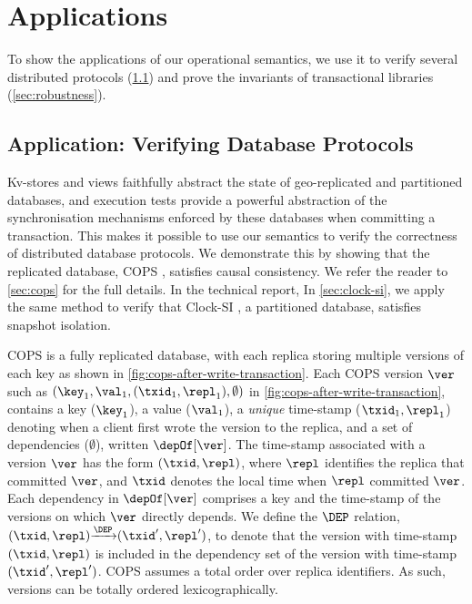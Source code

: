 \section{Applications}
\label{sec:applications}

To show the applications of our operational semantics, 
we use it to verify several distributed protocols (\cref{sec:verify-impl}) and
prove the invariants of transactional libraries (\cref{sec:robustness}).

\subsection{Application: Verifying Database Protocols}
\label{sec:verify-impl}
Kv-stores and views faithfully abstract the state of geo-replicated and partitioned
databases, and execution tests provide a powerful abstraction of the synchronisation mechanisms 
enforced by these databases when committing a transaction. 
This makes it possible to use our 
semantics to verify the correctness of distributed database protocols. 
We demonstrate this by showing that the replicated database,
COPS \cite{cops}, satisfies causal consistency.
We refer the reader to \cref{sec:cops} for the full details.
\ifTechRepEdits%
In the technical report,
\else%
In \cref{sec:clock-si}, 
\fi
we apply the same method to verify that 
Clock-SI \cite{clocksi}, a partitioned database, satisfies snapshot isolation.



COPS is a fully replicated database, with each replica storing multiple versions of each key as shown in \cref{fig:cops-after-write-transaction}. 
Each COPS version \( \ver \)
such as \( (\key_1,\val_1,(\txid_1,\repl_1), \emptyset) \) in \cref{fig:cops-after-write-transaction},
contains a key ($\key_1$), a value ($\val_1$), a \emph{unique} time-stamp ($\txid_1, \repl_1$) denoting
when a client first wrote the version to the replica, 
and a set of dependencies ($\emptyset$), written $\depOf[\ver]$. 
The time-stamp associated with a version $\ver$ has the form $(\txid, \repl)$, where $\repl$ identifies the replica that committed $\ver$, 
and $\txid$ denotes the local time when $\repl$ committed $\ver$. 
Each dependency in $\depOf[\ver]$ comprises a key and the time-stamp of the versions on which $\ver$ directly depends.  
We define the \( \DEP \) relation, \( (\txid,\repl) {\xrightarrow{\DEP}} (\txid',\repl') \),
to denote that the version with time-stamp \( (\txid,\repl) \) is included in the dependency set of the version with time-stamp \( (\txid',\repl')\).
COPS assumes a total order over replica identifiers. 
As such, versions can be totally ordered lexicographically. 


